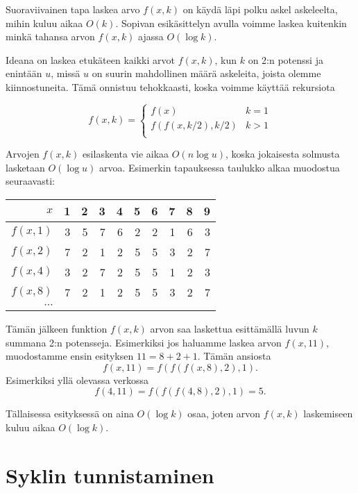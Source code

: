 Suoraviivainen tapa laskea arvo $f(x,k)$
on käydä läpi polku askel askeleelta, mihin kuluu aikaa $O(k)$.
Sopivan esikäsittelyn avulla voimme laskea kuitenkin
minkä tahansa arvon $f(x,k)$ ajassa $O(\log k)$.

Ideana on laskea etukäteen kaikki arvot $f(x,k)$, kun $k$ on 2:n potenssi
ja enintään $u$, missä $u$ on suurin mahdollinen määrä
askeleita, joista olemme kiinnostuneita.
Tämä onnistuu tehokkaasti, koska voimme käyttää rekursiota

\begin{equation*}
    f(x,k) = \begin{cases}
               f(x)              & k = 1\\
               f(f(x,k/2),k/2)   & k > 1\\
           \end{cases}
\end{equation*}

Arvojen $f(x,k)$ esilaskenta vie aikaa $O(n \log u)$,
koska jokaisesta solmusta lasketaan $O(\log u)$ arvoa.
Esimerkin tapauksessa taulukko alkaa muodostua seuraavasti:

\begin{center}
\begin{tabular}{r|rrrrrrrrr}
$x$ & 1 & 2 & 3 & 4 & 5 & 6 & 7 & 8 & 9 \\
\hline
$f(x,1)$ & 3 & 5 & 7 & 6 & 2 & 2 & 1 & 6 & 3 \\
$f(x,2)$ & 7 & 2 & 1 & 2 & 5 & 5 & 3 & 2 & 7 \\
$f(x,4)$ & 3 & 2 & 7 & 2 & 5 & 5 & 1 & 2 & 3 \\
$f(x,8)$ & 7 & 2 & 1 & 2 & 5 & 5 & 3 & 2 & 7 \\
$\cdots$ \\
\end{tabular}
\end{center}

Tämän jälkeen funktion $f(x,k)$ arvon saa laskettua
esittämällä luvun $k$ summana 2:n potensseja.
Esimerkiksi jos haluamme laskea arvon $f(x,11)$,
muodostamme ensin esityksen $11=8+2+1$.
Tämän ansiosta
\[f(x,11)=f(f(f(x,8),2),1).\]
Esimerkiksi yllä olevassa verkossa 
\[f(4,11)=f(f(f(4,8),2),1)=5.\]

Tällaisessa esityksessä on aina
$O(\log k)$ osaa, joten arvon $f(x,k)$ laskemiseen
kuluu aikaa $O(\log k)$.

\section{Syklin tunnistaminen}

